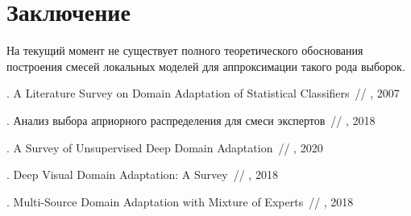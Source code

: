 \documentclass[12pt, twoside]{article}
\begin{document}
\section{Заключение}
На текущий момент не существует полного теоретического обоснования построения смесей локальных моделей для аппроксимации такого рода выборок. 

\begin{thebibliography}{99}


    .
   A Literature Survey on Domain Adaptation of Statistical Classifiers~//
    , 2007 %
    
    .
   Анализ выбора априорного распределения для смеси экспертов~//
    , 2018 %

    .
   A Survey of Unsupervised Deep Domain Adaptation~//
    , 2020
    
    .
   Deep Visual Domain Adaptation: A Survey~//
    , 2018
    
    .
   Multi-Source Domain Adaptation with Mixture of Experts~//
    , 2018
 
 	
\end{thebibliography}

\end{document}
